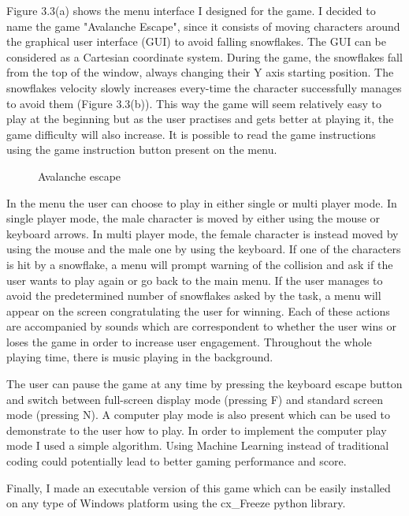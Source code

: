 Figure 3.3(a) shows the menu interface I designed for the game. I decided to name the game "Avalanche Escape", since it consists of moving characters around the graphical user interface (GUI) to avoid falling snowflakes. The GUI can be considered as a Cartesian coordinate system. During the game, the snowflakes fall from the top of the window, always changing their Y axis starting position. The snowflakes velocity slowly increases every-time the character successfully manages to avoid them (Figure 3.3(b)). This way the game will seem relatively easy to play at the beginning but as the user practises and gets better at playing it, the game difficulty will also increase. It is possible to read the game instructions using the game instruction button present on the menu. 
\begin{figure}[ht!]%
    \centering
    \qquad
    \caption{Avalanche escape}%
    \label{fig:example2}%
\end{figure}
In the menu the user can choose to play in either single or multi player mode. In single player mode, the male character is moved by either using the mouse or keyboard arrows. In multi player mode, the female character is instead moved by using the mouse and the male one by using the keyboard. If one of the characters is hit by a snowflake, a menu will prompt warning of the collision and ask if the user wants to play again or go back to the main menu. If the user manages to avoid the predetermined number of snowflakes asked by the task, a menu will appear on the screen congratulating the user for winning. Each of these actions are accompanied by sounds which are correspondent to whether the user wins or loses the game in order to increase user engagement. Throughout the whole playing time, there is music playing in the background.

The user can pause the game at any time by pressing the keyboard escape button and switch between full-screen display mode (pressing F) and standard screen mode (pressing N). A computer play mode is also present which can be used to demonstrate to the user how to play. In order to implement the computer play mode I used a simple algorithm. Using Machine Learning instead of traditional coding could potentially lead to better gaming performance and score. 

Finally, I made an executable version of this game which can be easily installed on any type of Windows platform using the cx\_Freeze python library.

